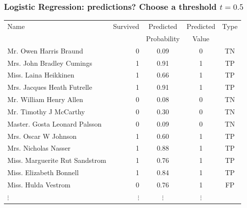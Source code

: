 \documentclass[aspectratio=169]{beamer}
\theoremstyle{principle}
\begin{document}
\begin{frame}
\frametitle{Logistic Regression: predictions?  Choose a threshold $t = 0.5$}

\begin{table}[ht]
\centering
\begin{tabular}{l | r | c | c | c}

 Name & Survived & Predicted & Predicted & Type\\ 
&&Probability&Value\\
  \hline
  \hline
 Mr. Owen Harris Braund &   0 & 0.09 & 0 & TN\\ 
 Mrs. John Bradley Cumings &   1 & 0.91 & 1 & TP\\ 
 Miss. Laina Heikkinen &   1 & 0.66 & 1 & TP\\ 
 Mrs. Jacques Heath Futrelle &   1 & 0.91 & 1 & TP\\ 
 Mr. William Henry Allen &   0 & 0.08 & 0 & TN\\ 
 Mr. Timothy J McCarthy &   0 & 0.30 & 0 & TN\\ 
 Master. Gosta Leonard Palsson &   0 & 0.09 & 0 & TN\\ 
 Mrs. Oscar W Johnson &   1 & 0.60 & 1 & TP\\ 
 Mrs. Nicholas Nasser &   1 & 0.88 & 1 & TP\\ 
 Miss. Marguerite Rut Sandstrom &   1 & 0.76 & 1 & TP\\ 
 Miss. Elizabeth Bonnell &   1 & 0.84 &1 & TP\\ 
 Miss. Hulda Vestrom &   0 & 0.76 &1 & FP\\ 
$\vdots$ & $\vdots$ & $\vdots$ & $\vdots$
\end{tabular}
\end{table}

\end{frame}
\end{document}
